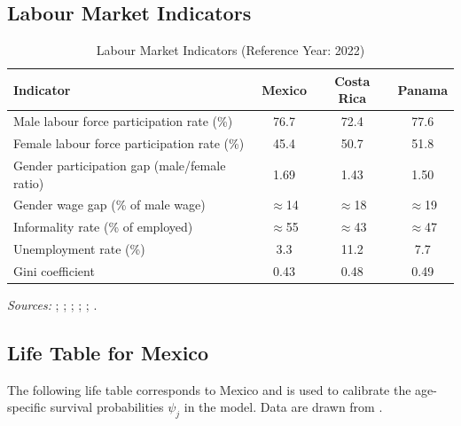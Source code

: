\documentclass[12pt,a4paper]{article}
\begin{document}
\begin{appendices}
\subsection{Labour Market Indicators}
\label{app:labour_table}

\begin{table}[H]
\centering
\caption{Labour Market Indicators (Reference Year: 2022)}
\label{tab:labour}
\begin{tabular}{lccc}
\hline\hline
\textbf{Indicator} & \textbf{Mexico} & \textbf{Costa Rica} & \textbf{Panama} \\
\hline
Male labour force participation rate (\%)    & 76.7        & 72.4        & 77.6        \\
Female labour force participation rate (\%)  & 45.4        & 50.7        & 51.8        \\
Gender participation gap (male/female ratio) & 1.69        & 1.43        & 1.50        \\
Gender wage gap (\% of male wage)            & $\approx$14 & $\approx$18 & $\approx$19 \\
Informality rate (\% of employed)            & $\approx$55 & $\approx$43 & $\approx$47 \\
Unemployment rate (\%)                       & 3.3         & 11.2        & 7.7         \\
Gini coefficient                             & 0.43        & 0.48        & 0.49        \\
\hline\hline
\end{tabular}
\begin{minipage}{\linewidth}
\smallskip
\footnotesize
\textit{Sources:} \citet{ILOILOSTAT2023}; \citet{ECLACILO2023};
\citet{IMF2023}; \citet{WEFGGR2024}; \citet{WorldBankWDI2024};
\citet{WorldBankPovCalNet2022}.
\end{minipage}
\end{table}

\subsection{Life Table for Mexico}
\label{app:survival}

The following life table corresponds to Mexico and is used to
calibrate the age-specific survival probabilities $\psi_{j}$ in the
model. Data are drawn from \citet{UISP2019}.


\end{appendices}
\end{document}
